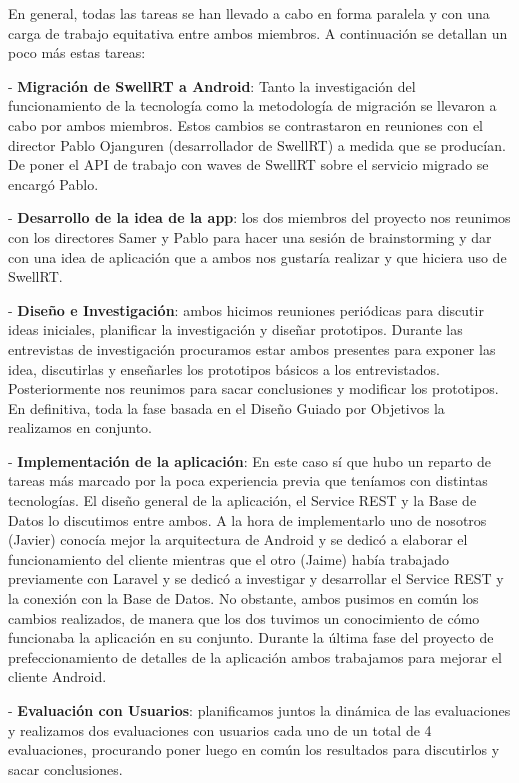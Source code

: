 En general, todas las tareas se han llevado a cabo en forma paralela y con una carga de trabajo equitativa entre ambos miembros. A continuación se detallan un poco más estas tareas:

- \textbf{Migración de SwellRT a Android}: Tanto la investigación del funcionamiento de la tecnología como la metodología de migración se llevaron a cabo por ambos miembros. Estos cambios se contrastaron en reuniones con el director Pablo Ojanguren (desarrollador de SwellRT) a medida que se producían. De poner el API de trabajo con waves de SwellRT sobre el servicio migrado se encargó Pablo.

- \textbf{Desarrollo de la idea de la app}: los dos miembros del proyecto nos reunimos con los directores Samer y Pablo para hacer una sesión de brainstorming y dar con una idea de aplicación que a ambos nos gustaría realizar y que hiciera uso de SwellRT.

- \textbf{Diseño e Investigación}: ambos hicimos reuniones periódicas para discutir ideas iniciales, planificar la investigación y diseñar prototipos. Durante las entrevistas de investigación procuramos estar ambos presentes para exponer las idea, discutirlas y enseñarles los prototipos básicos a los entrevistados. Posteriormente nos reunimos para sacar conclusiones y modificar los prototipos. En definitiva, toda la fase basada en el Diseño Guiado por Objetivos la realizamos en conjunto.

- \textbf{Implementación de la aplicación}: En este caso sí que hubo un reparto de tareas más marcado por la poca experiencia previa que teníamos con distintas tecnologías. El diseño general de la aplicación, el Service REST y la Base de Datos lo discutimos entre ambos. A la hora de implementarlo uno de nosotros (Javier) conocía mejor la arquitectura de Android y se dedicó a elaborar el funcionamiento del cliente mientras que el otro (Jaime) había trabajado previamente con Laravel y se dedicó a investigar y desarrollar el Service REST y la conexión con la Base de Datos. No obstante, ambos pusimos en común los cambios realizados, de manera que los dos tuvimos un conocimiento de cómo funcionaba la aplicación en su conjunto. Durante la última fase del proyecto de prefeccionamiento de detalles de la aplicación ambos trabajamos para mejorar el cliente Android.

- \textbf{Evaluación con Usuarios}: planificamos juntos la dinámica de las evaluaciones y realizamos dos evaluaciones con usuarios cada uno de un total de 4 evaluaciones, procurando poner luego en común los resultados para discutirlos y sacar conclusiones.

